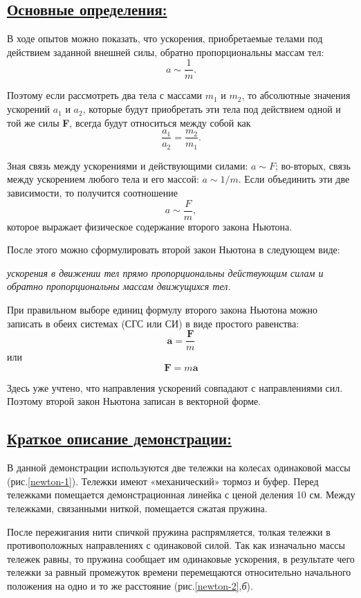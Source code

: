 \documentclass[14pt,a4paper,oneside]{extarticle}	%
\begin{document}
\newpage
\subsection*{\underline{Основные определения:}}

В ходе опытов можно показать, что ускорения, приобретаемые телами под действием заданной внешней силы, обратно пропорциональны массам тел: 
$$
a \sim \frac{1}{m}.
$$

Поэтому если рассмотреть два тела с массами $ m_1 $ и $ m_2 $, то абсолютные значения ускорений $ a_1 $ и $ a_2 $, которые будут приобретать эти тела под действием одной и той же силы \textbf{F}, всегда будут относиться между собой как
$$
\frac{a_1}{a_2} = \frac{m_2}{m_1}.
$$

Зная связь между ускорениями и действующими силами: $ a \sim F $; во-вторых, связь между ускорением любого тела и его массой: $ a \sim 1/m$. 
Если объединить эти две зависимости, то получится соотношение 
$$
a \sim \frac{F}{m},
$$
которое выражает физическое содержание второго закона Ньютона. 

После этого можно сформулировать второй закон Ньютона в 
следующем виде: 

\begin{flushleft}
	\textit{ускорения в движении тел прямо пропорциональны действующим 
силам и обратно пропорциональны массам движущихся тел. }
\end{flushleft}

При правильном выборе единиц формулу второго закона Ньютона 
можно записать в обеих системах (СГС или СИ) в виде простого равенства:
$$
 \textbf{a} = \frac{\textbf{F}}{m}
$$
 или
$$
\textbf{F} = m\textbf{a}
$$
 
Здесь уже учтено, что направления ускорений совпадают с направлениями сил.
Поэтому второй закон Ньютона записан в векторной форме.

\newpage
\subsection*{\underline{Краткое описание демонстрации:}}

В данной демонстрации используются две тележки на колесах одинаковой массы (рис.\ref{newton-1}).
Тележки имеют «механический» тормоз и буфер.
Перед тележками помещается демонстрационная линейка с ценой деления 10 см.
Между тележками, связанными ниткой, помещается сжатая пружина.

После пережигания нити спичкой пружина распрямляется, толкая тележки в противоположных направлениях с одинаковой силой.
Так как изначально массы тележек равны, то пружина сообщает им одинаковые ускорения, в результате чего тележки за равный промежуток времени перемещаются относительно начального положения на одно и то же расстояние (рис.\ref{newton-2},\textit{б}).      
\end{document}
